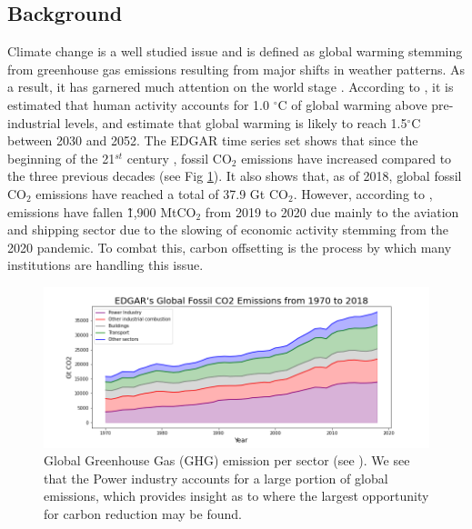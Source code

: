 \documentclass{article}
\begin{document}
\subsection{Background}

Climate change is a well studied issue and is defined as global warming stemming from greenhouse gas emissions resulting from major shifts in weather patterns. As a result, it has garnered much attention on the world stage \cite{Kal96,Ten00,Hij05}. According to \cite{Glo21}, it is estimated that human activity accounts for 1.0 $^\circ$C of global warming above pre-industrial levels, and estimate that global warming is likely to reach 1.5$^\circ$C between 2030 and 2052. The EDGAR time series set shows that since the beginning of the 21$^{st}$ century \cite{EDGAR19}, fossil CO$_{2}$ emissions have increased compared to the three previous decades (see Fig \ref{fig:edgars_co2_emissions}). It also shows that, as of 2018, global fossil CO$_{2}$ emissions have reached a total of 37.9 Gt CO$_{2}$. However, according to \cite{Liu20}, emissions have fallen \~ 1,900 MtCO$_{2}$ from 2019 to 2020 due mainly to the aviation and shipping sector due to the slowing of economic activity stemming from the 2020 pandemic. To combat this, carbon offsetting is the process by which many institutions are handling this issue. 

\begin{figure}[h]
\centering
\includegraphics[width=5in]{edgars_co2_emissions.png}
\caption{Global Greenhouse Gas (GHG) emission per sector (see \cite{EDGAR19}). We see that the Power industry accounts for a large portion of global emissions, which provides insight as to where the largest opportunity for carbon reduction may be found.} 
\label{fig:edgars_co2_emissions}
\end{figure} 
\end{document}
